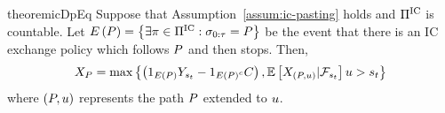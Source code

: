\begin{restatable}{theorem}{icDpEq}
    \label{thm:ic-dp-eq}
    Suppose that Assumption~\ref{assum:ic-pasting} holds
    and $\Pi^{\text{IC}}$ is countable. Let 
    \(
        E\left(P\right)
        =
        \left\{
            \exists \pi\in\Pi^{\text{IC}} :
            \sigma_{0:\tau}=P
        \right\}
    \)
    be the event that there is an IC exchange policy which follows $P$ and then stops. Then,
    \[
        X_{P}
        =
        \max\left\{
            \left(
                1_{
                    E\left(P\right)
                }
                Y_{s_{t}}
                -
                1_{
                    E\left(P\right)^c
                }
                C
            \right),
            \mathbb{E}\left[
                X_{
                    \left(
                        P, u
                    \right)
                }
                |
                \mathcal{F}_{s_{t}}
            \right]
            u
            > s_{t} 
        \right\}
    \]
    where 
    \(
        \left(
            P, u
        \right)
    \)
    represents the path $P$ extended to $u$.
\end{restatable}  

